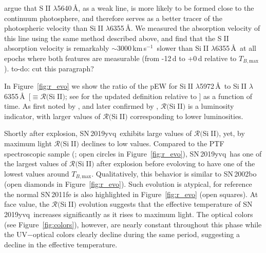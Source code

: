 \documentclass[twocolumn]{aastex63}
\def\ion#1#2{#1$\;${\footnotesize\rm{#2}}\relax}
\newcommand{\todo}[1]{{\color{magenta} to-do: {#1}}}
\newcommand{\tbmax}{$T_{B,\mathrm{max}}$}
\newcommand{\kms}{km\,s$^{-1}$}
\newcommand{\sn}{SN\,2019yvq}
\begin{document}
\citet{Benetti04} argue that \ion{S}{II} $\lambda$5640\,\AA, as a weak line,
is more likely to be formed close to the continuum photosphere, and therefore
serves as a better tracer of the photospheric velocity than \ion{Si}{II}
$\lambda$6355\,\AA. We measured the absorption velocity of this line using
the same method described above, and find that the \ion{S}{II} absorption
velocity is remarkably $\sim$3000\,\kms\ slower than \ion{Si}{II}
$\lambda$6355\,\AA\ at all epochs where both features are measurable (from
-12\,d to +0\,d relative to \tbmax). \todo{cut this paragraph?}

In Figure~\ref{fig:r_evo} we show the ratio of the pEW for \ion{Si}{II}
$\lambda$5972\,\AA\ to \ion{Si}{II} $\lambda$6355\,\AA\ [$\equiv
\mathcal{R}($\ion{Si}{II}$)$; see \citealt{Hachinger08} for the updated
definition relative to \citealt{Nugent95}] as a function of time. As first
noted by \citet{Nugent95}, and later confirmed by \citet{Hachinger08},
$\mathcal{R}($\ion{Si}{II}$)$ is a luminosity indicator, with larger values of
$\mathcal{R}($\ion{Si}{II}$)$ corresponding to lower luminosities. 

Shortly after explosion, \sn\ exhibits large values of
$\mathcal{R}($\ion{Si}{II}$)$, yet, by maximum light
$\mathcal{R}($\ion{Si}{II}$)$ declines to low values. Compared to the PTF
spectroscopic sample (\citealt{Maguire14}; open circles in
Figure~\ref{fig:r_evo}), \sn\ has one of the largest values of
$\mathcal{R}($\ion{Si}{II}$)$ after explosion before evoloving to have one of
the lowest values around \tbmax. Qualitatively, this behavior is similar to
SN\,2002bo (open diamonds in Figure~\ref{fig:r_evo}). Such evolution is
atypical, for reference the normal SN\,2011fe is also highlighted in
Figure~\ref{fig:r_evo} (open squares). At face value, the
$\mathcal{R}($\ion{Si}{II}$)$ evolution suggests that the effective
temperature of \sn\ increases significantly as it rises to maximum light. The
optical colors (see Figure~\ref{fig:colors}), however, are nearly constant
throughout this phase while the UV$ - $optical colors clearly decline during
the same period, suggesting a decline in the effective temperature.
\end{document}
